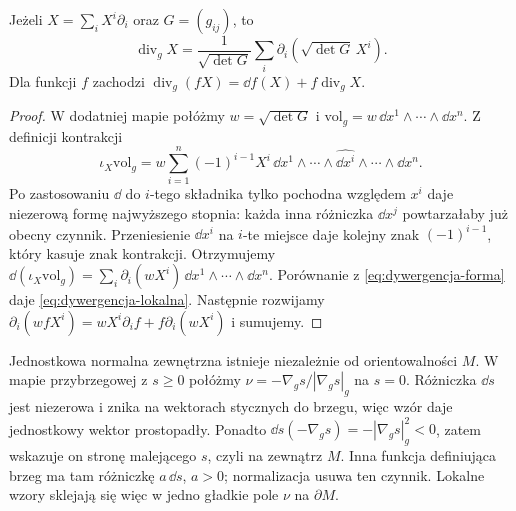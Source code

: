 \begin{stwierdzenie}
\label{prop:div-lokalnie}
Jeżeli $X=\sum_i X^i\partial_i$ oraz $G=(g_{ij})$,
to
\begin{equation}\label{eq:dywergencja-lokalna}
 \operatorname{div}_gX
 =\frac{1}{\sqrt{\det G}}\sum_i
          \partial_i\!\left(\sqrt{\det G}\,X^i\right).
\end{equation}
Dla funkcji $f$ zachodzi
$\operatorname{div}_g(fX)
=\dd f(X)+f\operatorname{div}_gX$.
\end{stwierdzenie}
\begin{proof}
W dodatniej mapie połóżmy
$w=\sqrt{\det G}$ i
$\mathrm{vol}_g=w\,\dd x^1\wedge\cdots
\wedge\dd x^n$. Z definicji kontrakcji
\[
 \iota_X\mathrm{vol}_g
 =w\sum_{i=1}^n(-1)^{i-1}X^i\,
    \dd x^1\wedge\cdots\wedge
    \widehat{\dd x^i}\wedge\cdots\wedge\dd x^n.
\]
Po zastosowaniu $\dd$ do $i$-tego składnika
tylko pochodna względem $x^i$ daje
niezerową formę najwyższego stopnia:
każda inna różniczka $\dd x^j$ powtarzałaby
już obecny czynnik. Przeniesienie
$\dd x^i$ na $i$-te miejsce daje kolejny
znak $(-1)^{i-1}$, który kasuje znak
kontrakcji. Otrzymujemy
$\dd(\iota_X\mathrm{vol}_g)
=\sum_i\partial_i(wX^i)\,
  \dd x^1\wedge\cdots\wedge\dd x^n$.
Porównanie z \eqref{eq:dywergencja-forma}
daje \eqref{eq:dywergencja-lokalna}.
Następnie rozwijamy
$\partial_i(wfX^i)=wX^i\partial_i f
  +f\partial_i(wX^i)$ i sumujemy.
\end{proof}

Jednostkowa normalna zewnętrzna istnieje niezależnie
od orientowalności $M$. W mapie przybrzegowej z
$s\geq0$ połóżmy
$\nu=-\nabla_g s/|\nabla_g s|_g$ na $s=0$.
Różniczka $\dd s$ jest niezerowa i znika na wektorach
stycznych do brzegu, więc wzór daje jednostkowy wektor
prostopadły. Ponadto
$\dd s(-\nabla_gs)=-|\nabla_gs|_g^2<0$,
zatem wskazuje on stronę malejącego $s$, czyli na zewnątrz $M$.
Inna funkcja
definiująca brzeg ma tam różniczkę $a\,\dd s$, $a>0$;
normalizacja usuwa ten czynnik. Lokalne wzory sklejają
się więc w jedno gładkie pole $\nu$ na $\partial M$.

